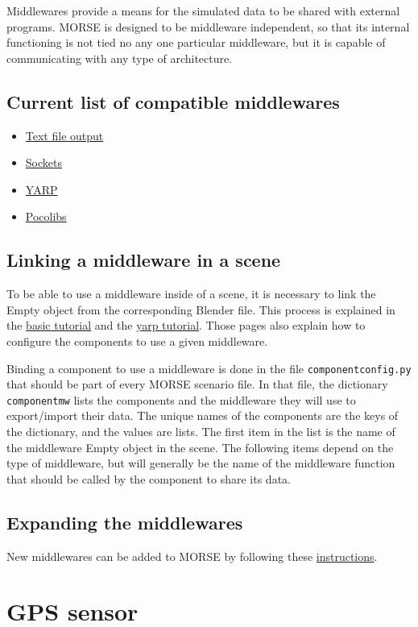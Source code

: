\documentclass[twoside,a4paper,10pt]{report}
\newcommand{\dokutitlelevelone}[1]{\chapter{#1}}
\newcommand{\dokutitleleveltwo}[1]{\section{#1}}
\newcommand{\dokumonospace}[1]{\texttt{#1}}
\newcommand{\dokuitem}{\item}
\begin{document}
Middlewares provide a means for the simulated data to be shared with external programs. MORSE is designed to be middleware independent, so that its internal functioning is not tied no any one particular middleware, but it is capable of communicating with any type of architecture.


\dokutitleleveltwo{Current list of compatible middlewares}
\label{92515de7e8c9f43d6ca122cbbfd1809e}%

\begin{itemize}
\dokuitem  \hyperref[1cb251ec0d568de6a929b520c4aed8d1]{ Text file output}
\dokuitem  \hyperref[61f2529360aec54f5dc9804b842cf3fa]{ Sockets}
\dokuitem  \hyperref[ec46d0b85077d7a7fe8da2e2b4c70462]{ YARP}
\dokuitem  \hyperref[15f13a3fccdd1ef095539316b61c03c8]{ Pocolibs}
\end{itemize}

\dokutitleleveltwo{Linking a middleware in a scene}
\label{5ded332fc3ba470e4d4d290c9bf26a19}%

To be able to use a middleware inside of a scene, it is necessary to link the Empty object from the corresponding Blender file. This process is explained in the \hyperref[0575c8d592fb7b088226750aceec2b4e]{ basic tutorial} and the \hyperref[1dd029a60f7f3dd1deaf993ce4538edf]{ yarp tutorial}. Those pages also explain how to configure the components to use a given middleware.

Binding a component to use a middleware is done in the file \dokumonospace{component{\textunderscore}config.py} that should be part of every MORSE scenario file. In that file, the dictionary \dokumonospace{component{\textunderscore}mw} lists the components and the middleware they will use to export/import their data. The unique names of the components are the keys of the dictionary, and the values are lists. The first item in the list is the name of the middleware Empty object in the scene. The following items depend on the type of middleware, but will generally be the name of the middleware function that should be called by the component to share its data.


\dokutitleleveltwo{Expanding the middlewares}
\label{b3a6313d335453f4c7ad970485acc1a1}%

New middlewares can be added to MORSE by following these \hyperref[6a8f80abb2f3d2288ad863e67f2499a4]{ instructions}.


\dokutitlelevelone{GPS sensor}
\label{fa7c7c892a3b7d9c01ef03ed367274b8}%
\label{11648e4e66e7ed6a86cb7f1d0cf604fe}%
\end{document}
